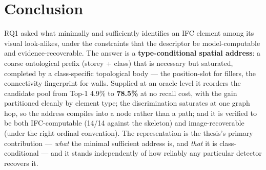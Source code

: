 \section{Conclusion}

RQ1 asked what minimally and sufficiently identifies an IFC element among its visual look-alikes,
under the constraints that the descriptor be model-computable and evidence-recoverable. The answer is
a \textbf{type-conditional spatial address}: a coarse ontological prefix (storey + class) that is
necessary but saturated, completed by a class-specific topological body --- the position-slot for
fillers, the connectivity fingerprint for walls. Supplied at an oracle level it reorders the candidate
pool from Top-1 4.9\% to \textbf{78.5\%} at no recall cost, with the gain partitioned cleanly by
element type; the discrimination saturates at one graph hop, so the address compiles into a node
rather than a path; and it is verified to be both IFC-computable (14/14 against the skeleton) and
image-recoverable (under the right ordinal convention). The representation is the thesis's primary
contribution --- \emph{what} the minimal sufficient address is, and \emph{that} it is class-conditional
--- and it stands independently of how reliably any particular detector recovers it.
